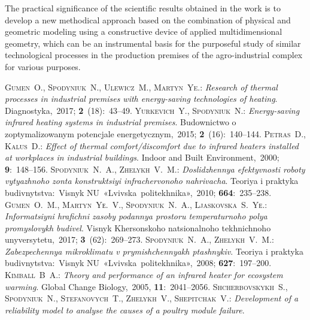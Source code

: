 \documentclass[12pt,twoside]{article}
\begin{document}
\begin{JGGarticle}
			The practical significance of the scientific results obtained in the work is to develop a new methodical approach based on the combination of physical and geometric modeling using a constructive device of applied multidimensional geometry, which can be an instrumental basis for the purposeful study of similar technological processes in the production premises of the agro-industrial complex for various purposes.
			
		\begin{thebibliography}{99}
				{\scshape Gumen~O., Spodyniuk~N., Ulewicz~M., Martyn~Ye.}:
				{\itshape Research of thermal processes in industrial premises with energy-saving technologies of heating}.
				Diagnostyka,~2017; \textbf{2}~(18):~43--49.
				{\scshape Yurkevich~Y., Spodyniuk~N.}:
				{\itshape Energy-saving infrared heating systems in industrial premises}.
				Budownictwo o zoptymalizowanym potencjale energetycznym,~2015; \textbf{2}~(16):~140--144.
				{\scshape Petras~D., Kalus~D.}:
				{\itshape Effect of thermal comfort/discomfort due to infrared heaters installed at workplaces in industrial buildings}.
				Indoor and Built Environment,~2000; \textbf{9}:~148--156.
				{\scshape Spodyniuk~N.~A., Zhelykh~V.~M.}:
				{\itshape Doslidzhennya efektyvnosti roboty vytyazhnoho zonta konstruktsiyi infrachervonoho nahrivacha}.
				Teoriya i praktyka budivnytstva:~Visnyk NU~«Lvivska~politekhnika»,~2010; \textbf{664}:~235--238.
				{\scshape Gumen~O.~M., Martyn~Yе.~V., Spodyniuk~N.~A., Ljaskovska~S.~Yе.}:
				{\itshape Informatsiyni hrafichni zasoby podannya prostoru temperaturnoho polya promyslovykh budivel}.
				Visnyk Khersonskoho natsionalnoho tekhnichnoho unyversytetu,~2017; \textbf{3}~(62):~269--273.
				{\scshape Spodyniuk~N.~A., Zhelykh~V.~M.}:
				{\itshape Zabezpechennya mikroklimatu v prymishchennyakh ptashnykiv}.
				Teoriya i praktyka budivnytstva:~Visnyk NU~«Lvivska~politekhnika»,~2008; \textbf{627}:~197--200.
				{\scshape Kimball~B~A.}:
				{\itshape Theory and performance of an infrared heater for ecosystem warming}.
				Global Change Biology,~2005, \textbf{11}:~2041--2056.
				{\scshape Shcherbovskykh~S., Spodyniuk~N., Stefanovych~T., Zhelykh~V., Shepitchak~V.}:
				{\itshape Development of a reliability model to analyse the causes of a poultry module failure}.

\end{thebibliography}
\end{JGGarticle}
\end{document}
